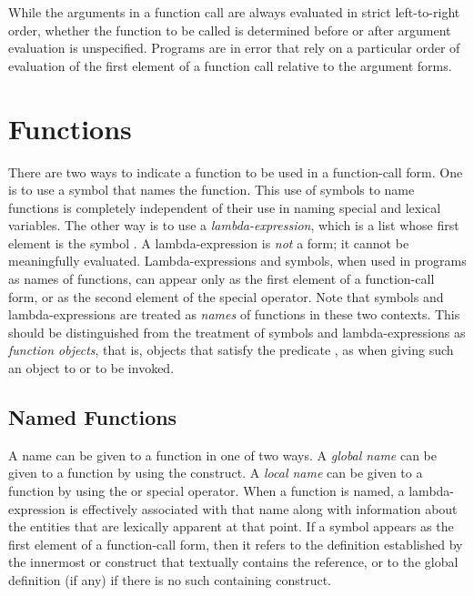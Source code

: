 While the arguments in a function call are always
evaluated in strict left-to-right order, whether the function to
be called is determined before or after argument evaluation
is unspecified.  Programs are in error
that rely on a particular order of evaluation
of the first element of a function call relative to the
argument forms.

\section{Functions}

There are two ways to indicate a function to be used in a function-call
form.  One is to use a symbol that names the function.  This use of
symbols to name functions is completely independent of their use in
naming special and lexical variables.  The other way is to use a
\emph{lambda-expression}, which is a list whose first element is the symbol
.  A lambda-expression is \emph{not} a form; it cannot be
meaningfully evaluated.  Lambda-expressions and symbols, when used in
programs as names of functions, can appear only as the first element of a
function-call form, or as the second element of the 
special operator.  Note that symbols and lambda-expressions are treated as
\emph{names} of functions in these two contexts.  This should be
distinguished from the treatment of symbols and lambda-expressions as
\emph{function objects}, that is,
objects that satisfy the predicate ,
as when giving such an object to  or  to be
invoked.

\subsection{Named Functions}

A name can be given to a function in one of two ways.
A \emph{global name} can be given to a function by using the
 construct.
A \emph{local name} can be given to a function by using the
 or
 special operator.
When a function is named, a lambda-expression is effectively
associated with that name
along with information about the entities that are lexically apparent
at that point.
If a symbol appears as the first element of a function-call form, then it
refers to the definition established by the innermost  or 
construct that textually contains the reference, or to the global
definition (if any) if there is no such containing construct.

